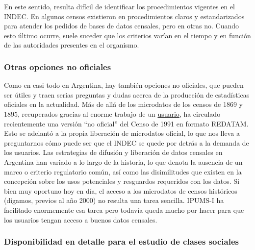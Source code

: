 \documentclass[
]{article}
\begin{document}
En este sentido, resulta difícil de identificar los procedimientos vigentes en el INDEC. En algunos censos existieron en procedimientos claros y estandarizados para atender los pedidos de bases de datos censales, pero en otras no. Cuando esto último ocurre, suele suceder que los criterios varían en el tiempo y en función de las autoridades presentes en el organismo.

\hypertarget{otras-opciones-no-oficiales}{%
\subsubsection{Otras opciones no oficiales}\label{otras-opciones-no-oficiales}}

Como en casi todo en Argentina, hay también opciones no oficiales, que pueden ser útiles y traen serias preguntas y dudas acerca de la producción de estadísticas oficiales en la actualidad. Más de allá de los microdatos de los censos de 1869 y 1895, recuperados gracias al enorme trabajo de un \href{https://observatoriocensal.org/2015/12/01/recuperacion-de-microdatos-de-los-censos-argentinos-de-poblacion-1869-1895/}{usuario}, ha circulado recientemente una versión ``no oficial'' del Censo de 1991 en formato REDATAM. Esto se adelantó a la propia liberación de microdatos oficial, lo que nos lleva a preguntarnos cómo puede ser que el INDEC se quede por detrás a la demanda de los usuarios. Las estrategias de difusión y liberación de datos censales en Argentina han variado a lo largo de la historia, lo que denota la ausencia de un marco o criterio regulatorio común, así como las disimilitudes que existen en la concepción sobre los usos potenciales y resguardos requeridos con los datos. Si bien muy oportuno hoy en día, el acceso a los microdatos de censos históricos (digamos, previos al año 2000) no resulta una tarea sencilla. IPUMS-I ha facilitado enormemente esa tarea pero todavía queda mucho por hacer para que los usuarios tengan acceso a buenos datos censales.

\hypertarget{disponibilidad-en-detalle-para-el-estudio-de-clases-sociales}{%
\subsubsection{Disponibilidad en detalle para el estudio de clases sociales}\label{disponibilidad-en-detalle-para-el-estudio-de-clases-sociales}}
\end{document}
